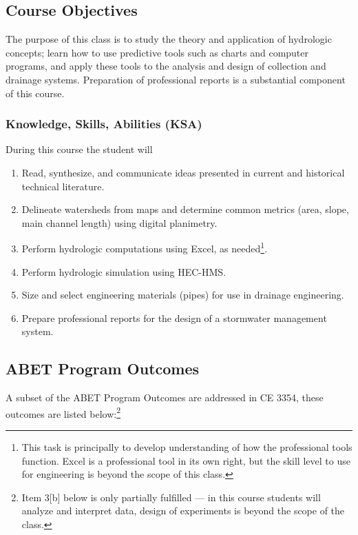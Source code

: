 \documentclass[12pt]{article}
\begin{document}
\subsection*{{Course Objectives}}
The purpose of this class is to study the theory and application of hydrologic concepts; learn how to use predictive tools such as charts and computer programs, and apply these tools to the analysis and design of collection and drainage systems.  Preparation of professional reports is a substantial component of this course.
\subsubsection*{{Knowledge, Skills, Abilities (KSA)}}
During this course the student will
\begin{enumerate}
\item Read, synthesize, and communicate ideas presented in current and historical technical literature.
\item Delineate watersheds from maps and determine common metrics (area, slope, main channel length) using digital planimetry.
\item Perform hydrologic computations using Excel, as needed\footnote{This task is principally to develop understanding of how the professional tools function.  Excel is a professional tool in its own right, but the skill level to use for engineering is beyond the scope of this class.}.
\item Perform hydrologic simulation using HEC-HMS.
\item Size and select engineering materials (pipes) for use in drainage engineering.
\item Prepare professional reports for the design of a stormwater management system.  

\end{enumerate}

\subsection*{ABET Program Outcomes}
A subset of the ABET Program Outcomes are addressed in CE 3354, these outcomes are listed below:\footnote{Item 3[b] below is only partially fulfilled --- in this course students will analyze and interpret data, design of experiments is beyond the scope of the class.}
\end{document}
